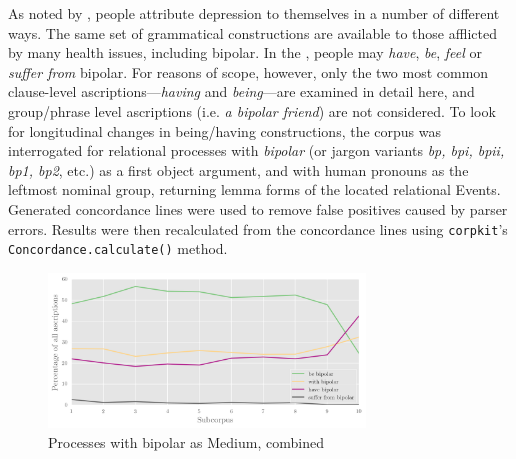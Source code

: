 As noted by \textcite{harvey_disclosures_2012}, people attribute depression to themselves in a number of different ways. The same set of grammatical constructions are available to those afflicted by many health issues, including \gls{bipolar}. In the , people may \emph{have}, \emph{be}, \emph{feel} or \emph{suffer from} bipolar. For reasons of scope, however, only the two most common clause-level ascriptions---\emph{having} and \emph{being}---are examined in detail here, and group\slash phrase level ascriptions (i.e. \emph{a bipolar friend}) are not considered. To look for longitudinal changes in being\slash having constructions, the \gls{corpus} was interrogated for relational processes with \emph{bipolar} (or jargon variants \emph{bp, bpi, bpii, bp1, bp2}, etc.) as a first object argument, and with human pronouns as the leftmost nominal group, returning lemma forms of the located relational Events. Generated concordance lines were used to remove false positives caused by parser errors. Results were then recalculated from the concordance lines using \texttt{corpkit}'s \texttt{Concordance.calculate()} method.


\begin{figure}[htb]
  \begin{center}
  \includegraphics[width=0.75\textwidth]{../images/being_having.png}
  \end{center}
  \caption{Processes with bipolar as Medium, combined}
  \label{fig:behave}
  \end{figure}

